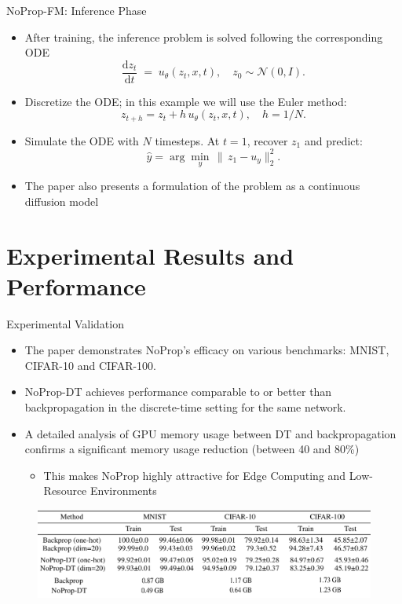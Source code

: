 \documentclass{beamer}
\begin{document}
\begin{frame}{NoProp-FM: Inference Phase}
  \begin{itemize}
    \item After training, the inference problem is solved following the corresponding ODE
      \[
        \frac{\mathrm{d}z_t}{\mathrm{d}t} \;=\; u_{\theta}(z_t,x, t), 
        \quad z_0\sim\mathcal{N}(0,I).
      \]
    \item Discretize the ODE; in this example we will use the Euler method:
      \[
        z_{t+h} = z_t + h\,u_{\theta}(z_t,x,t),\quad h=1/N.
      \]
    \item Simulate the ODE with $N$ timesteps. At \(t=1\), recover $z_1$ and predict:
      \[
        \hat y = \arg\min_{y}\,\|\,z_1 - u_y\|_2^2.
      \]

      \item The paper also presents a formulation of the problem as a continuous diffusion model
  \end{itemize}
\end{frame}



\section{Experimental Results and Performance}

\begin{frame}{Experimental Validation}
    \begin{itemize}
        \item The paper demonstrates NoProp's efficacy on various benchmarks: MNIST, CIFAR-10 and CIFAR-100.
        \item NoProp-DT achieves performance comparable to or better than backpropagation in the discrete-time setting for the same network.

\item A detailed analysis of GPU memory usage between DT and backpropagation confirms a significant memory usage reduction (between 40 and 80\%)
 \begin{itemize}
            \item This makes NoProp highly attractive for Edge Computing and Low-Resource Environments 
\end{itemize}

    \end{itemize}

    \begin{figure}
        \centering
        \includegraphics[width=1\linewidth]{Screenshot 2025-08-05 155100.png}
    \end{figure}
\end{frame}
\end{document}
